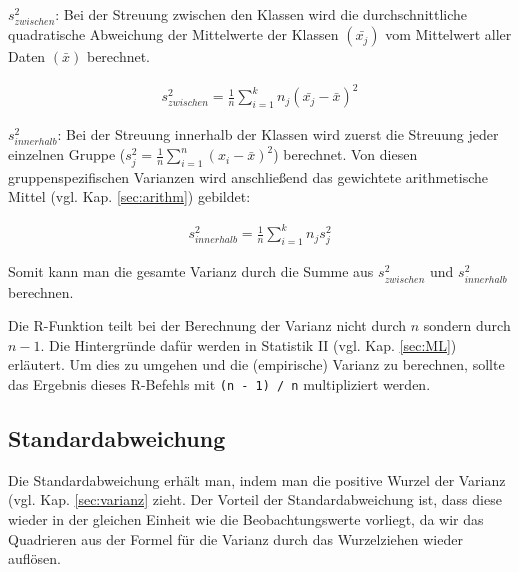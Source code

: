 \documentclass[a4paper]{article}
\newcommand\dangersign{%
 \makebox[1.8em][c]{%
 \makebox[0pt][c]{\raisebox{.15em}{\small!}}%
 \makebox[0pt][c]{\color{red}\Large$\triangle$}}}%
\begin{document}
\noindent $s^2_{zwischen}$: Bei der Streuung zwischen den Klassen wird die durchschnittliche quadratische Abweichung der Mittelwerte der Klassen $(\bar{x_j})$ vom Mittelwert aller Daten $(\bar{x})$ berechnet.

\begin{align*}
    s^2_{zwischen} = \frac{1}{n} \sum_{i=1}^k n_j (\bar{x_j}-\bar{x})^2
\end{align*}

\noindent $s^2_{innerhalb}$: Bei der Streuung innerhalb der Klassen wird zuerst die Streuung jeder einzelnen Gruppe ($s^2_j=\frac{1}{n} \sum_{i=1}^n (x_i-\bar{x})^2$) berechnet. Von diesen gruppenspezifischen Varianzen wird anschließend das gewichtete arithmetische Mittel (vgl. Kap. \ref{sec:arithm}) gebildet:

\begin{align*}
    s^2_{innerhalb} = \frac{1}{n} \sum_{i=1}^k n_j s^2_j
\end{align*}

\noindent Somit kann man die gesamte Varianz durch die Summe aus $s^2_{zwischen}$ und $s^2_{innerhalb}$ berechnen.\\

\noindent {}

\noindent \dangersign Die R-Funktion teilt bei der Berechnung der Varianz nicht durch $n$ sondern durch $n-1$. Die Hintergründe dafür werden in Statistik II (vgl. Kap. \ref{sec:ML}) erläutert. Um dies zu umgehen und die (empirische) Varianz zu berechnen, sollte das Ergebnis dieses R-Befehls mit \texttt{(n - 1) / n} multipliziert werden.

\subsection{Standardabweichung}
Die Standardabweichung erhält man, indem man die positive Wurzel der Varianz (vgl. Kap. \ref{sec:varianz} zieht. Der Vorteil der Standardabweichung ist, dass diese wieder in der gleichen Einheit wie die Beobachtungswerte vorliegt, da wir das Quadrieren aus der Formel für die Varianz durch das Wurzelziehen wieder auflösen.\\

\noindent {}
\end{document}
